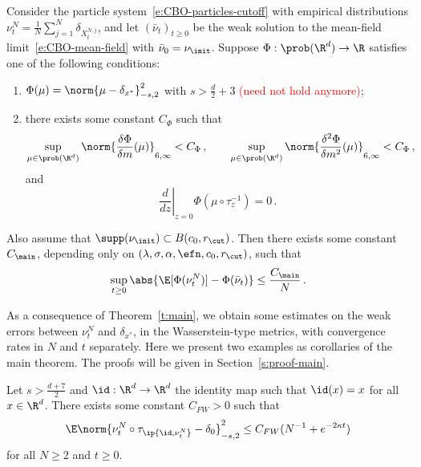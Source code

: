\documentclass{amsart}
\begin{document}
\begin{theorem}
\label{t:main}
    Consider the particle system~\eqref{e:CBO-particles-cutoff} with empirical distributions $\nu^N_t = \frac{1}{N} \sum_{j=1}^N \delta_{X^{N,j}_t}$, and let $(\bar \nu_t)_{t \ge 0}$ be the weak solution to the mean-field limit~\eqref{e:CBO-mean-field} with $\bar \nu_0 = \nu_{\init}$.
    Suppose $\Phi: \prob(\R^d) \to \R$ satisfies one of the following conditions:
    \begin{enumerate}
        \item $\Phi(\mu) = \norm{\mu - \delta_{x^\ast}}_{-s,2}^2$ with $s > \frac{d}{2} + 3$ \textcolor{red}{(need not hold anymore)};

        \item there exists some constant $C_\Phi$ such that 
        \begin{equation}
        \label{e:phi-reg-6}
            \sup_{\mu\in \prob(\R^d)} \norm{\frac{\delta \Phi}{\delta m}(\mu)}_{6,\infty} < C_\Phi \,, \qquad \sup_{\mu\in \prob(\R^d)} \norm{\frac{\delta^2 \Phi}{\delta m^2}(\mu)}_{6,\infty} < C_\Phi \,,
        \end{equation}
        and 
        \begin{equation}
        \label{e:phi-translate-inv}
            \left. \frac{d}{dz} \right\vert_{z=0} \Phi(\mu \circ \tau_z^{-1}) = 0 \,.
        \end{equation}
    \end{enumerate}
    Also assume that $\supp(\nu_\init) \subset B(c_0,r_\cut)$. 
    Then there exists some constant $C_{\main}$, depending only on $(\lambda, \sigma, \alpha, \efn, c_0, r_\cut)$, such that 
    \begin{equation*}
        \sup_{t \ge 0} \abs{ \E[\Phi(\nu^N_t)] - \Phi(\bar \nu_t) } \le \frac{C_\main}{N} \,.
    \end{equation*}
\end{theorem}
\fi 

As a consequence of Theorem~\ref{t:main}, we obtain some estimates on the weak errors between $\nu^N_t$ and $\delta_{x^\ast}$, in the Wasserstein-type metrics, with convergence rates in $N$ and $t$ separately. 
Here we present two examples as corollaries of the main theorem.
The proofs will be given in Section~\ref{s:proof-main}.

\begin{corollary}
\label{co:conv-in-t-N}
    Let $s > \frac{d+7}{2}$ and $\id: \R^d \to \R^d$ the identity map such that $\id(x) = x$ for all $x \in \R^d$.
    There exists some constant $C_{FW} > 0$ such that 
    \begin{equation*}
        \E \norm{\nu^N_t \circ \tau_{\ip{\id, \nu^N_t}} - \delta_0}_{-s,2}^2 \le C_{FW} (N^{-1} + e^{-2\kappa t} )
    \end{equation*}
    for all $N \ge 2$ and $t \ge 0$.
\end{corollary}
\end{document}

